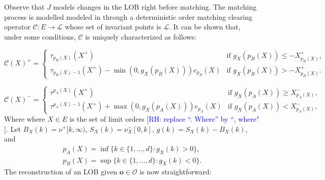 \documentclass[10pt,a4paper,oneside]{article}
\newcommand{\Bo}{\mathcal{L}}
\newcommand{\rh}[1]{\textcolor{blue}{\textsf{[RH: #1]}}}
\providecommand{\DIFaddtex}[1]{{\protect\color{blue} \sf #1}} %
\providecommand{\DIFdeltex}[1]{{\protect\color{red} \scriptsize #1}} %
\providecommand{\DIFaddbegin}{} %
\providecommand{\DIFaddend}{} %
\providecommand{\DIFdelbegin}{} %
\providecommand{\DIFdelend}{} %
\providecommand{\DIFadd}[1]{\texorpdfstring{\DIFaddtex{#1}}{#1}} %
\providecommand{\DIFdel}[1]{\texorpdfstring{\DIFdeltex{#1}}{}} %
\newcommand{\DIFscaledelfig}{0.5}
\newlength{\DIFdelgraphicswidth} %
\newlength{\DIFdelgraphicsheight} %
\newcommand{\DIFaddincludegraphics}[2][]{{\color{blue}\fbox{\DIFOincludegraphics[#1]{#2}}}} %
\newcommand{\DIFdelincludegraphics}[2][]{%
\sbox{\DIFdelgraphicsbox}{\DIFOincludegraphics[#1]{#2}}%
\settoboxwidth{\DIFdelgraphicswidth}{\DIFdelgraphicsbox} %
\settoboxtotalheight{\DIFdelgraphicsheight}{\DIFdelgraphicsbox} %
\scalebox{\DIFscaledelfig}{%
\parbox[b]{\DIFdelgraphicswidth}{\usebox{\DIFdelgraphicsbox}\\[-\baselineskip] \rule{\DIFdelgraphicswidth}{0em}}\llap{\resizebox{\DIFdelgraphicswidth}{\DIFdelgraphicsheight}{%
\setlength{\unitlength}{\DIFdelgraphicswidth}%
\begin{picture}(1,1)%
\thicklines\linethickness{2pt} %
{\color[rgb]{1,0,0}\put(0,0){\framebox(1,1){}}}%
{\color[rgb]{1,0,0}\put(0,0){\line( 1,1){1}}}%
{\color[rgb]{1,0,0}\put(0,1){\line(1,-1){1}}}%
\end{picture}%
}\hspace*{3pt}}} %
} %
\DeclareRobustCommand{\DIFaddbegin}{\DIFOaddbegin \let\includegraphics\DIFaddincludegraphics} %
\DeclareRobustCommand{\DIFaddend}{\DIFOaddend \let\includegraphics\DIFOincludegraphics} %
\DeclareRobustCommand{\DIFdelbegin}{\DIFOdelbegin \let\includegraphics\DIFdelincludegraphics} %
\DeclareRobustCommand{\DIFdelend}{\DIFOaddend \let\includegraphics\DIFOincludegraphics} %
\begin{document}
Observe that $J$ models changes in the LOB right before matching. The matching process is \DIFdelbegin \DIFdel{modelled }\DIFdelend \DIFaddbegin \DIFadd{modeled }\DIFaddend in \cite{cont2023mathematical} through a deterministic order matching clearing operator $\mathcal{C} : E \rightarrow \Bo$ whose set of invariant points is $\Bo$. It can be shown that, under some conditions, $\mathcal{C}$ is uniquely characterized as follows:

\begin{equation*}
    \mathcal{C}(X)^+ = \begin{cases}
        \tau_{p_B(X)}(X^+) & \text{if } g_X(p_B(X)) \leq - X^+_{p_B(X)},\\
        \tau_{p_B(X) - 1}(X^+) - \min(0, g_X(p_B(X))) e_{p_B}(X) & \text{if } g_X(p_B(X)) > - X^+_{p_B(X)}.  
    \end{cases}
\end{equation*}

\begin{equation*}
    \mathcal{C}(X)^- = \DIFdelbegin %
\DIFdelend \DIFaddbegin \begin{cases}
        \tau^{p_A(X)}(X^+) & \text{if } g_X(p_A(X)) \geq X^-_{p_A(X)},\\
        \tau^{p_A(X) - 1}(X^+) + \max(0, g_X(p_A(X))) e_{p_A}(X) & \text{if } g_X(p_A(X)) <  X^-_{p_A(X)},  
    \end{cases}\DIFaddend 
\end{equation*}
\DIFdelbegin \DIFdel{Where }\DIFdelend \DIFaddbegin \DIFadd{where }\DIFaddend $X \in E$ is the set of limit orders\DIFdelbegin \DIFdel{\rh{replace ``. Where'' by ``, where" }}\DIFdelend . Let $B_X(k) = \nu^+[k, \infty)$, $S_X(k) = \nu^-_X[0, k]$, $g(k) = S_X(k) - B_X(k)$, and
\begin{align*}
    p_A(X) = \inf \{ k \in \{1, \dots, d \} : g_X(k) > 0 \},\\
    p_B(X) = \sup \{ k \in \{1, \dots, d \} : g_X(k) < 0 \}.
\end{align*}
The reconstruction of an LOB given $\mathbf{o} \in  \mathcal{O}$ is now straightforward:
\end{document}
